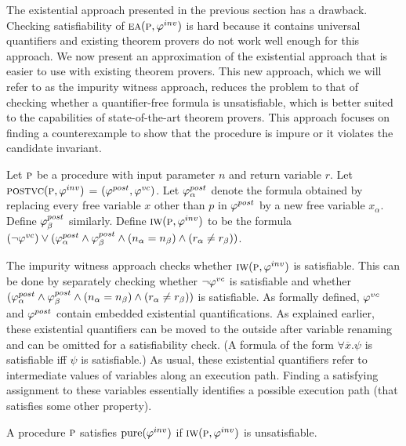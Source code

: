 The existential approach presented in the previous section has a drawback. Checking satisfiability of $\textsc{ea}(\textsc{p},\varphi^{inv})$
is hard because it contains universal quantifiers and existing theorem provers do not work well enough for this
approach. We now present an approximation of the existential approach that is easier to use with existing theorem
provers. This new approach, which we will refer to as the impurity witness approach, reduces the problem to
that of checking whether a quantifier-free formula is unsatisfiable, which is better suited to the capabilities of
state-of-the-art theorem provers. This approach focuses on finding a counterexample to show that the
procedure is impure or it violates the candidate invariant.

Let $\textsc{p}$ be a procedure with input parameter $n$ and return variable $r$.
Let $\textsc{postvc}({\textsc{p}},{\varphi^{inv}})$ = $(\varphi^{post},\varphi^{vc})$.
Let $\varphi^{post}_\alpha$ denote the formula obtained by replacing every free variable $x$ other than $p$ in $\varphi^{post}$
by a new free variable $x_\alpha$. Define $\varphi^{post}_\beta$ similarly.
Define $\textsc{iw}(\textsc{p}, \varphi^{inv})$ to be the formula $(\neg \varphi^{vc}) \vee (\varphi^{post}_\alpha \wedge \varphi^{post}_\beta \wedge (n_\alpha = n_\beta) \wedge (r_\alpha \neq r_\beta))$.

The impurity witness approach checks whether $\textsc{iw}(\textsc{p}, \varphi^{inv})$ is satisfiable. This can be done by separately checking
whether $\neg \varphi^{vc}$ is satisfiable and whether $(\varphi^{post}_\alpha \wedge \varphi^{post}_\beta \wedge (n_\alpha = n_\beta) \wedge (r_\alpha \neq r_\beta))$
is satisfiable. As formally defined, $\varphi^{vc}$ and $\varphi^{post}$ contain embedded existential quantifications. As explained earlier,
these existential quantifiers can be moved to the outside after variable renaming and can be omitted for a satisfiability check.
(A formula of the form $\forall \overline{x}. \psi$ is satisfiable iff $\psi$ is satisfiable.)
As usual, these existential quantifiers refer to intermediate values of variables along an execution path.
Finding a satisfying assignment to these variables essentially identifies a possible execution path (that
satisfies some other property).

\begin{theorem}
A procedure $\textsc{p}$ satisfies  $\mathrm{pure}(\varphi^{inv})$ if $\textsc{iw}(\textsc{p}, \varphi^{inv})$ is unsatisfiable.
\end{theorem}

